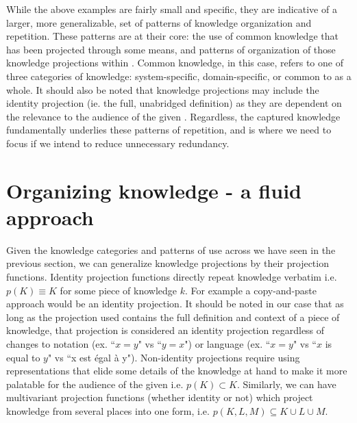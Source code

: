 While the above examples are fairly small and specific, they are indicative of 
a larger, more generalizable, set of patterns of knowledge organization and 
repetition. These patterns are at their core: the use of common knowledge that 
has been projected through some means, and patterns of organization of those 
knowledge projections within \sfs{}. Common knowledge, in this case, refers to 
one of three categories of knowledge: system-specific, domain-specific, or 
common to \sfs{} as a whole. It should also be noted that knowledge projections 
may include the identity projection (ie. the full, unabridged definition) as 
they are dependent on the relevance to the audience of the given \sf{}. 
Regardless, the captured knowledge fundamentally underlies these patterns of 
repetition, and is where we need to focus if we intend to reduce unnecessary 
redundancy.

\section{Organizing knowledge - a fluid approach}
%
%

Given the knowledge categories and patterns of use across \sfs{} we have seen 
in the previous section, we can generalize knowledge projections by their 
projection functions. Identity projection functions directly repeat knowledge 
verbatim i.e. $p(K) \equiv K$ for some piece of knowledge $k$. For example a 
copy-and-paste approach would be an identity projection.  It should be noted in 
our case that as long as the projection used contains the full definition and 
context of a piece of knowledge, that projection is considered an identity 
projection regardless of changes to notation (ex. ``$x = y$" vs ``$y = x$") or 
language (ex. ``$x = y$" vs ``$x$ is equal to $y$" vs ``x est \'egal \`a y"). 
Non-identity projections require using representations that elide some details 
of the knowledge at hand to make it more palatable for the audience of the 
given \sf{} i.e. $p(K) \subset K$. Similarly, we can have multivariant 
projection functions (whether identity or not) which project knowledge from 
several places into one form, i.e. $p(K,L,M) \subseteq K\cup L\cup M$.

